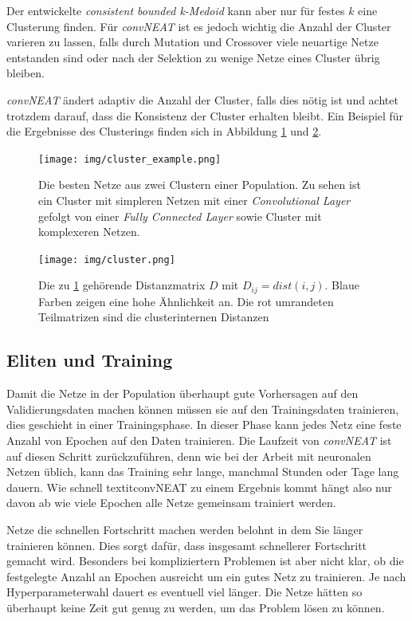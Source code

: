 \documentclass[]{scrartcl}
\begin{document}
				Der entwickelte \textit{consistent bounded k-Medoid} kann aber nur für festes $k$ eine Clusterung finden.
				Für \textit{convNEAT} ist es jedoch wichtig die Anzahl der Cluster varieren zu lassen, falls durch Mutation und Crossover viele
				neuartige Netze entstanden sind oder nach der Selektion zu wenige Netze eines Cluster übrig bleiben.

				\textit{convNEAT} ändert adaptiv die Anzahl der Cluster, falls dies nötig ist und achtet trotzdem darauf, dass die Konsistenz der Cluster erhalten bleibt.
				Ein Beispiel für die Ergebnisse des Clusterings finden sich in Abbildung \ref{fig:clust_ex} und \ref{fig:clust_d}.

				\begin{figure}[h]
					\centering
					\texttt{[image: img/cluster\_example.png]}
					\caption{Die besten Netze aus zwei Clustern einer Population. Zu sehen ist ein Cluster mit simpleren Netzen mit einer
						\textit{Convolutional Layer} gefolgt von einer \textit{Fully Connected Layer} sowie Cluster mit komplexeren Netzen.}
					\label{fig:clust_ex}
				\end{figure}

				\begin{figure}[h]
					\centering
					\texttt{[image: img/cluster.png]}
					\caption{Die zu \ref{fig:clust_ex} gehörende Distanzmatrix $D$ mit $D_{ij} = dist(i, j)$.
						Blaue Farben zeigen eine hohe Ähnlichkeit an. Die rot umrandeten Teilmatrizen sind die clusterinternen Distanzen}
					\label{fig:clust_d}
				\end{figure}

		\subsection{Eliten und Training}
			
			Damit die Netze in der Population überhaupt gute Vorhersagen auf den Validierungsdaten machen können müssen sie auf den Trainingsdaten trainieren, dies geschieht in einer Trainingsphase.
			In dieser Phase kann jedes Netz eine feste Anzahl von Epochen auf den Daten trainieren. Die Laufzeit von \textit{convNEAT} ist auf diesen Schritt zurückzuführen, denn 
			wie bei der Arbeit mit neuronalen Netzen üblich, kann das Training sehr lange, manchmal Stunden oder Tage lang dauern.
			Wie schnell textit{convNEAT} zu einem Ergebnis kommt hängt also nur davon ab wie viele Epochen alle Netze gemeinsam trainiert werden.

			Netze die schnellen Fortschritt machen werden belohnt in dem Sie länger trainieren können. Dies sorgt dafür, dass insgesamt schnellerer Fortschritt gemacht wird.
			Besonders bei kompliziertern Problemen ist aber nicht klar, ob die festgelegte Anzahl an Epochen ausreicht um ein gutes Netz zu trainieren.
			Je nach Hyperparameterwahl dauert es eventuell viel länger. Die Netze hätten so überhaupt keine Zeit gut genug zu werden, um das Problem lösen zu können.
\end{document}
